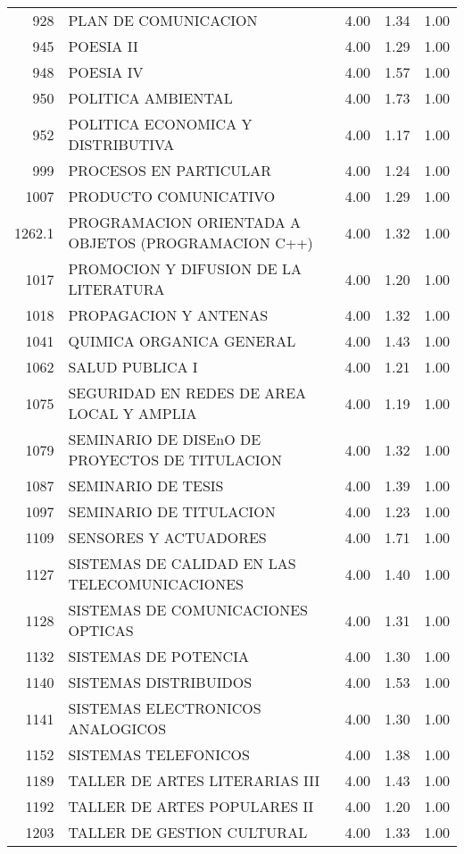 \documentclass[12pt]{article}
\begin{document}
\begin{table}[ht]
\begin{tabular}{rlrrr}
  928 & PLAN DE COMUNICACION & 4.00 & 1.34 & 1.00 \\ 
  945 & POESIA II & 4.00 & 1.29 & 1.00 \\ 
  948 & POESIA IV & 4.00 & 1.57 & 1.00 \\ 
  950 & POLITICA AMBIENTAL & 4.00 & 1.73 & 1.00 \\ 
  952 & POLITICA ECONOMICA Y DISTRIBUTIVA & 4.00 & 1.17 & 1.00 \\ 
  999 & PROCESOS EN PARTICULAR & 4.00 & 1.24 & 1.00 \\ 
  1007 & PRODUCTO COMUNICATIVO & 4.00 & 1.29 & 1.00 \\ 
  1262.1 & PROGRAMACION ORIENTADA A OBJETOS (PROGRAMACION C++) & 4.00 & 1.32 & 1.00 \\ 
  1017 & PROMOCION Y DIFUSION DE LA LITERATURA & 4.00 & 1.20 & 1.00 \\ 
  1018 & PROPAGACION Y ANTENAS & 4.00 & 1.32 & 1.00 \\ 
  1041 & QUIMICA ORGANICA GENERAL & 4.00 & 1.43 & 1.00 \\ 
  1062 & SALUD PUBLICA I & 4.00 & 1.21 & 1.00 \\ 
  1075 & SEGURIDAD EN REDES DE AREA LOCAL Y AMPLIA & 4.00 & 1.19 & 1.00 \\ 
  1079 & SEMINARIO DE DISEnO DE PROYECTOS DE TITULACION & 4.00 & 1.32 & 1.00 \\ 
  1087 & SEMINARIO DE TESIS & 4.00 & 1.39 & 1.00 \\ 
  1097 & SEMINARIO DE TITULACION & 4.00 & 1.23 & 1.00 \\ 
  1109 & SENSORES Y ACTUADORES & 4.00 & 1.71 & 1.00 \\ 
  1127 & SISTEMAS DE CALIDAD EN LAS TELECOMUNICACIONES & 4.00 & 1.40 & 1.00 \\ 
  1128 & SISTEMAS DE COMUNICACIONES OPTICAS & 4.00 & 1.31 & 1.00 \\ 
  1132 & SISTEMAS DE POTENCIA & 4.00 & 1.30 & 1.00 \\ 
  1140 & SISTEMAS DISTRIBUIDOS & 4.00 & 1.53 & 1.00 \\ 
  1141 & SISTEMAS ELECTRONICOS ANALOGICOS & 4.00 & 1.30 & 1.00 \\ 
  1152 & SISTEMAS TELEFONICOS & 4.00 & 1.38 & 1.00 \\ 
  1189 & TALLER DE ARTES LITERARIAS III & 4.00 & 1.43 & 1.00 \\ 
  1192 & TALLER DE ARTES POPULARES II & 4.00 & 1.20 & 1.00 \\ 
  1203 & TALLER DE GESTION CULTURAL & 4.00 & 1.33 & 1.00 \\ 

\end{tabular}
\end{table}
\end{document}
